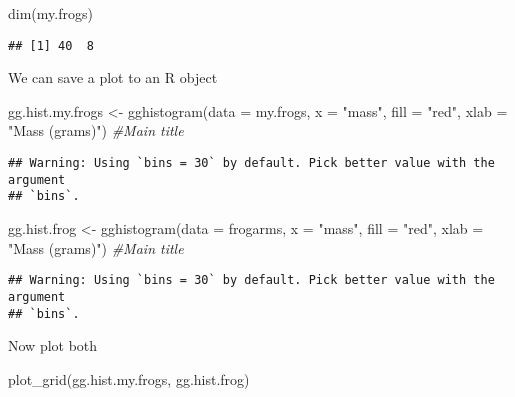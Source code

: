 \documentclass[
]{book}
\newenvironment{Shaded}{\begin{snugshade}}{\end{snugshade}}
\newcommand{\AttributeTok}[1]{\textcolor[rgb]{0.77,0.63,0.00}{#1}}
\newcommand{\CommentTok}[1]{\textcolor[rgb]{0.56,0.35,0.01}{\textit{#1}}}
\newcommand{\FunctionTok}[1]{\textcolor[rgb]{0.00,0.00,0.00}{#1}}
\newcommand{\NormalTok}[1]{#1}
\newcommand{\OtherTok}[1]{\textcolor[rgb]{0.56,0.35,0.01}{#1}}
\newcommand{\StringTok}[1]{\textcolor[rgb]{0.31,0.60,0.02}{#1}}
\begin{document}
\begin{Shaded}
\begin{Highlighting}[]
\FunctionTok{dim}\NormalTok{(my.frogs)}
\end{Highlighting}
\end{Shaded}

\begin{verbatim}
## [1] 40  8
\end{verbatim}

We can save a plot to an R object

\begin{Shaded}
\begin{Highlighting}[]
\NormalTok{gg.hist.my.frogs }\OtherTok{\textless{}{-}} \FunctionTok{gghistogram}\NormalTok{(}\AttributeTok{data =}\NormalTok{ my.frogs,}
            \AttributeTok{x =} \StringTok{"mass"}\NormalTok{,}
            \AttributeTok{fill =} \StringTok{"red"}\NormalTok{,}
            \AttributeTok{xlab =} \StringTok{"Mass (grams)"}\NormalTok{) }\CommentTok{\#Main title}
\end{Highlighting}
\end{Shaded}

\begin{verbatim}
## Warning: Using `bins = 30` by default. Pick better value with the argument
## `bins`.
\end{verbatim}

\begin{Shaded}
\begin{Highlighting}[]
\NormalTok{gg.hist.frog }\OtherTok{\textless{}{-}} \FunctionTok{gghistogram}\NormalTok{(}\AttributeTok{data =}\NormalTok{ frogarms,}
            \AttributeTok{x =} \StringTok{"mass"}\NormalTok{,}
            \AttributeTok{fill =} \StringTok{"red"}\NormalTok{,}
            \AttributeTok{xlab =} \StringTok{"Mass (grams)"}\NormalTok{) }\CommentTok{\#Main title}
\end{Highlighting}
\end{Shaded}

\begin{verbatim}
## Warning: Using `bins = 30` by default. Pick better value with the argument
## `bins`.
\end{verbatim}

Now plot both

\begin{Shaded}
\begin{Highlighting}[]
\FunctionTok{plot\_grid}\NormalTok{(gg.hist.my.frogs,}
\NormalTok{          gg.hist.frog)}
\end{Highlighting}
\end{Shaded}
\end{document}
